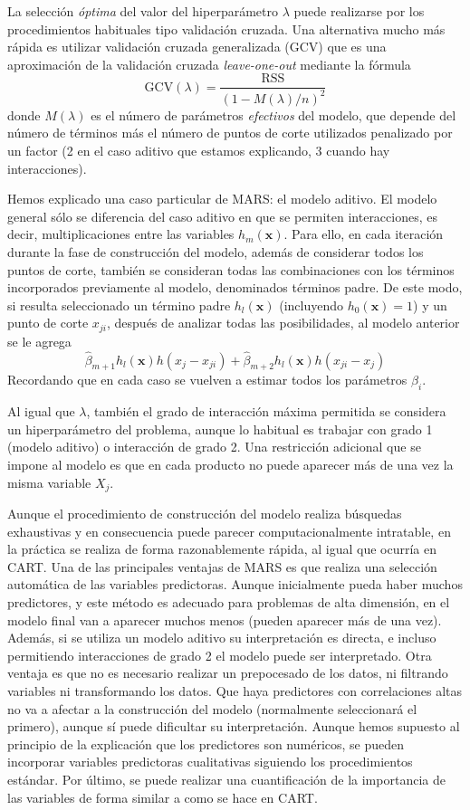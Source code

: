 \documentclass[
  spanish,
]{book}
\theoremstyle{break}
\theoremstyle{definition}
\theoremstyle{definition}
\theoremstyle{definition}
\theoremstyle{definition}
\theoremstyle{remark}
\begin{document}
La selección \emph{óptima} del valor del hiperparámetro \(\lambda\) puede realizarse por los procedimientos habituales tipo validación cruzada. Una alternativa mucho más rápida es utilizar validación cruzada generalizada (GCV) que es una aproximación de la validación cruzada \emph{leave-one-out} mediante la fórmula
\[\mbox{GCV} (\lambda) = \frac{\mbox{RSS}}{(1-M(\lambda)/n)^2}\]
donde \(M(\lambda)\) es el número de parámetros \emph{efectivos} del modelo, que depende del número de términos más el número de puntos de corte utilizados penalizado por un factor (2 en el caso aditivo que estamos explicando, 3 cuando hay interacciones).

Hemos explicado una caso particular de MARS: el modelo aditivo. El modelo general sólo se diferencia del caso aditivo en que se permiten interacciones, es decir, multiplicaciones entre las variables \(h_m(\mathbf{x})\).
Para ello, en cada iteración durante la fase de construcción del modelo, además de considerar todos los puntos de corte, también se consideran todas las combinaciones con los términos incorporados previamente al modelo, denominados términos padre.
De este modo, si resulta seleccionado un término padre \(h_l(\mathbf{x})\) (incluyendo \(h_0(\mathbf{x}) = 1\)) y un punto de corte \(x_{ji}\), después de analizar todas las posibilidades, al modelo anterior se le agrega
\[\hat \beta_{m+1} h_l(\mathbf{x}) h(x_j - x_{ji}) + \hat \beta_{m+2} h_l(\mathbf{x}) h(x_{ji} - x_j)\]
Recordando que en cada caso se vuelven a estimar todos los parámetros \(\beta_i\).

Al igual que \(\lambda\), también el grado de interacción máxima permitida se considera un hiperparámetro del problema, aunque lo habitual es trabajar con grado 1 (modelo aditivo) o interacción de grado 2. Una restricción adicional que se impone al modelo es que en cada producto no puede aparecer más de una vez la misma variable \(X_j\).

Aunque el procedimiento de construcción del modelo realiza búsquedas exhaustivas y en consecuencia puede parecer computacionalmente intratable, en la práctica se realiza de forma razonablemente rápida, al igual que ocurría en CART.
Una de las principales ventajas de MARS es que realiza una selección automática de las variables predictoras.
Aunque inicialmente pueda haber muchos predictores, y este método es adecuado para problemas de alta dimensión, en el modelo final van a aparecer muchos menos (pueden aparecer más de una vez).
Además, si se utiliza un modelo aditivo su interpretación es directa, e incluso permitiendo interacciones de grado 2 el modelo puede ser interpretado.
Otra ventaja es que no es necesario realizar un prepocesado de los datos, ni filtrando variables ni transformando los datos.
Que haya predictores con correlaciones altas no va a afectar a la construcción del modelo (normalmente seleccionará el primero), aunque sí puede dificultar su interpretación.
Aunque hemos supuesto al principio de la explicación que los predictores son numéricos, se pueden incorporar variables predictoras cualitativas siguiendo los procedimientos estándar.
Por último, se puede realizar una cuantificación de la importancia de las variables de forma similar a como se hace en CART.
\end{document}
